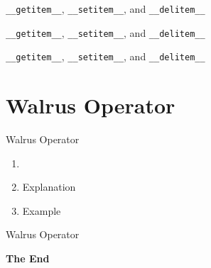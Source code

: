 \documentclass[aspectratio=169,xcolor=dvipsnames]{beamer}
\begin{document}

\begin{frame}{\texttt{\_\_getitem\_\_}, \texttt{\_\_setitem\_\_}, and \texttt{\_\_delitem\_\_}}
  \begin{example}
    
  \end{example}
\end{frame}


\begin{frame}{\texttt{\_\_getitem\_\_}, \texttt{\_\_setitem\_\_}, and \texttt{\_\_delitem\_\_}}
  \begin{example}
    
  \end{example}
\end{frame}


\begin{frame}{\texttt{\_\_getitem\_\_}, \texttt{\_\_setitem\_\_}, and \texttt{\_\_delitem\_\_}}
  \begin{example}
    
  \end{example}
\end{frame}


\section{Walrus Operator}

\begin{frame}{Walrus Operator}
    \begin{enumerate}
        \item
        \item Explanation
        \item Example
    \end{enumerate}
\end{frame}

\begin{frame}{Walrus Operator}
  \begin{example}
  
  \end{example}
\end{frame}


\begin{frame}
    \Huge{\centerline{\textbf{The End}}}
\end{frame}

\end{document}
